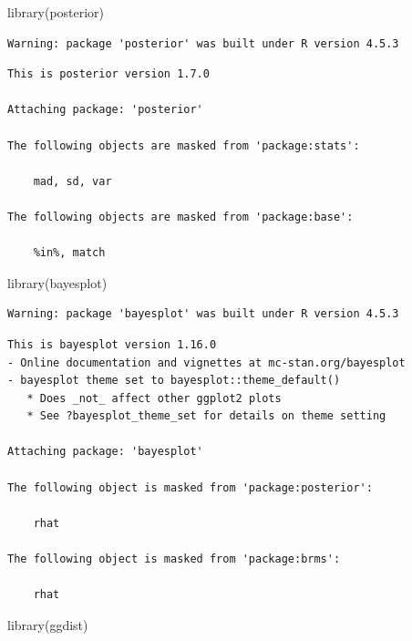\documentclass[
  letterpaper,
  DIV=11,
  numbers=noendperiod]{scrartcl}
\newenvironment{Shaded}{\begin{snugshade}}{\end{snugshade}}
\newcommand{\FunctionTok}[1]{\textcolor[rgb]{0.28,0.35,0.67}{#1}}
\newcommand{\NormalTok}[1]{\textcolor[rgb]{0.00,0.23,0.31}{#1}}
\begin{document}
\begin{Shaded}
\begin{Highlighting}[]
\FunctionTok{library}\NormalTok{(posterior)}
\end{Highlighting}
\end{Shaded}

\begin{verbatim}
Warning: package 'posterior' was built under R version 4.5.3
\end{verbatim}

\begin{verbatim}
This is posterior version 1.7.0

Attaching package: 'posterior'

The following objects are masked from 'package:stats':

    mad, sd, var

The following objects are masked from 'package:base':

    %in%, match
\end{verbatim}

\begin{Shaded}
\begin{Highlighting}[]
\FunctionTok{library}\NormalTok{(bayesplot)}
\end{Highlighting}
\end{Shaded}

\begin{verbatim}
Warning: package 'bayesplot' was built under R version 4.5.3
\end{verbatim}

\begin{verbatim}
This is bayesplot version 1.16.0
- Online documentation and vignettes at mc-stan.org/bayesplot
- bayesplot theme set to bayesplot::theme_default()
   * Does _not_ affect other ggplot2 plots
   * See ?bayesplot_theme_set for details on theme setting

Attaching package: 'bayesplot'

The following object is masked from 'package:posterior':

    rhat

The following object is masked from 'package:brms':

    rhat
\end{verbatim}

\begin{Shaded}
\begin{Highlighting}[]
\FunctionTok{library}\NormalTok{(ggdist)}
\end{Highlighting}
\end{Shaded}
\end{document}
